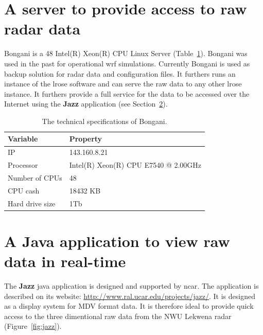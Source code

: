 \documentclass{wrcreport}
\begin{document}
\section{A server to provide access to raw radar data}

Bongani is a 48 Intel(R) Xeon(R) CPU Linux Server
(Table~\ref{table:bongani}). Bongani was used in the past for
operational \gls{wrf} simulations. Currently Bongani is used as backup
solution for radar data and configuration files. It furthers runs an
instance of the \gls{lrose} software and can serve the raw data to any
other \gls{lrose} instance. It furthers provide a full service for the
data to be accessed over the Internet using the \textbf{Jazz}
application (see Section~\ref{sec:java}).

\begin{table}[!htbp]
  \caption[The technical specifications of Bongani.]{The technical specifications of Bongani.}
  \label{table:bongani}
  \begin{center}
\begin{tabular}{l l} 
\toprule
\bfseries Variable & \bfseries Property \\
\midrule
IP & 143.160.8.21 \\
Processor & Intel(R) Xeon(R) CPU E7540 @ 2.00GHz\\
Number of CPUs & 48 \\
CPU cash & 18432 KB \\
Hard drive size & 1Tb \\
\bottomrule
\end{tabular}
  \end{center}
\end{table}

\section{A Java application to view raw data in real-time}
\label{sec:java}

The \textbf{Jazz} java application is designed and supported by
\gls{ncar}. The application is described on its website:
\url{http://www.ral.ucar.edu/projects/jazz/}. It is designed as a
display system for MDV format data. It is therefore ideal to provide
quick access to the three dimentional raw data from the NWU Lekwena
radar (Figure~\ref{fig:jazz}). 
\end{document}
